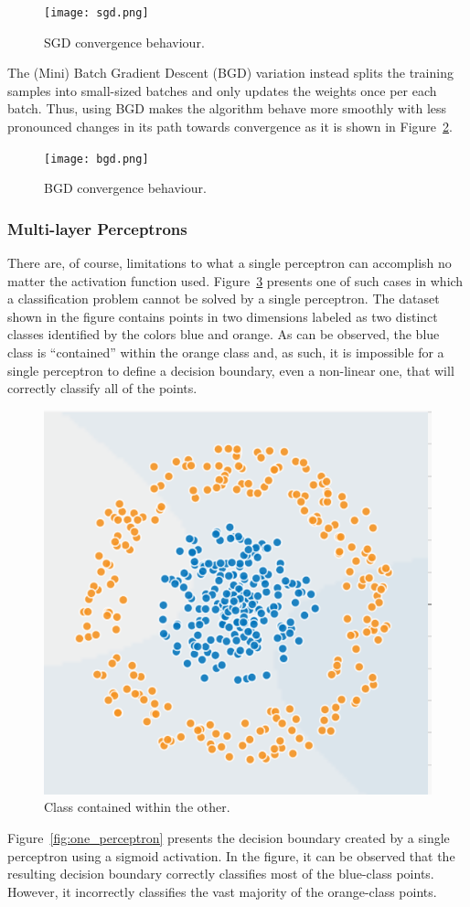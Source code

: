 \begin{figure}[!htbp]
    \centering
    \texttt{[image: sgd.png]}
    \caption{SGD convergence behaviour.}
    \label{fig:sgd}
\end{figure}

The (Mini) Batch Gradient Descent (BGD) variation instead splits the training samples into small-sized batches and only updates the weights once per each batch. Thus, using BGD makes the algorithm behave more smoothly with less pronounced changes in its path towards convergence as it is shown in Figure~\ref{fig:bgd}.

\begin{figure}[!htbp]
    \centering
    \texttt{[image: bgd.png]}
    \caption{BGD convergence behaviour.}
    \label{fig:bgd}
\end{figure}

\subsubsection{Multi-layer Perceptrons}

There are, of course, limitations to what a single perceptron can accomplish no matter the activation function used. Figure~\ref{fig:unsolvable} presents one of such cases in which a classification problem cannot be solved by a single perceptron. The dataset shown in the figure contains points in two dimensions labeled as two distinct classes identified by the colors blue and orange. As can be observed, the blue class is ``contained'' within the orange class and, as such, it is impossible for a single perceptron to define a decision boundary, even a non-linear one, that will correctly classify all of the points. 

\begin{figure}[!htbp]
    \centering
    \includegraphics[width=.35\textwidth]{Images/circles.png}
    \caption{Class contained within the other.}
    \label{fig:unsolvable}
\end{figure}

Figure~\ref{fig:one_perceptron} presents the decision boundary created by a single perceptron using a sigmoid activation. In the figure, it can be observed that the resulting decision boundary correctly classifies most of the blue-class points. However, it incorrectly classifies the vast majority of the orange-class points.

